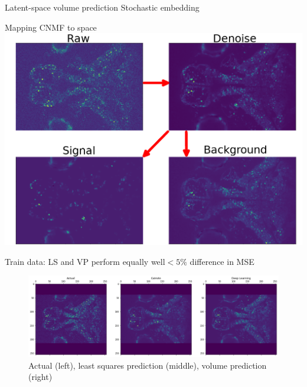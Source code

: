 \begin{frame}{ Latent-space volume prediction  }{Stochastic embedding}
	\resizebox{\textwidth}{!}{}
	\uncover<2>{
		\centering
		vs. \\
		$n_{t+5} = A n_t$
	}
\end{frame}{}

\begin{frame}{ Mapping CNMF to space }
	\includegraphics[width=\textwidth]{media/cnmf_arrow.png}
\end{frame}{}

\begin{frame}{Train data: LS and VP perform equally well}{$<5\%$ difference in MSE}
	\centering
	\begin{figure}
		\includegraphics[width=\textwidth]{media/train_mse}
		\caption{Actual (left), least squares prediction (middle), volume prediction (right)}
	\end{figure}
\end{frame}


